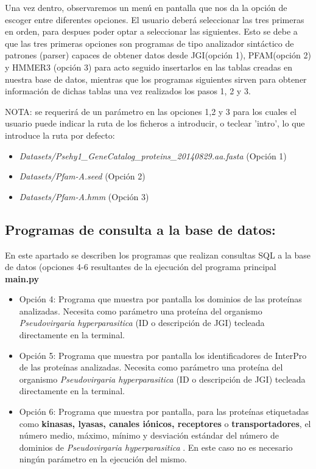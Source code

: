 \documentclass[11pt]{article} %
\begin{document}
Una vez dentro, observaremos un menú en pantalla que nos da la opción de escoger entre diferentes opciones. El usuario deberá seleccionar las tres primeras en orden, para despues poder optar a seleccionar las siguientes.
Esto se debe a que las tres primeras opciones son programas de tipo analizador sintáctico de patrones (parser) capaces de obtener datos desde JGI(opción 1), PFAM(opción 2) y HMMER3 (opción 3) para acto seguido insertarlos en las tablas creadas en nuestra base de datos, mientras que los programas siguientes sirven para obtener información de dichas tablas una vez realizados los pasos 1, 2 y 3.

NOTA: se requerirá de un parámetro en las opciones 1,2 y 3 para los cuales el usuario puede indicar la ruta de los ficheros a introducir, o teclear 'intro', lo que introduce la ruta por defecto:

\begin{itemize}

\item \emph{Datasets/Psehy1\_GeneCatalog\_proteins\_20140829.aa.fasta} (Opción 1)

\item \emph{Datasets/Pfam-A.seed} (Opción 2)

\item \emph{Datasets/Pfam-A.hmm} (Opción 3)

\end{itemize}

\subsection{Programas de consulta a la base de datos:}

En este apartado se describen los programas que realizan consultas SQL a la base de datos (opciones 4-6 resultantes de la ejecución del programa principal \textbf{main.py}

\begin{itemize}

\item Opción 4: Programa que muestra por pantalla los dominios de las proteínas analizadas. Necesita como parámetro una proteína del organismo \emph{Pseudovirgaria hyperparasitica} (ID o descripción de JGI) tecleada directamente en la terminal.

\item Opción 5: Programa que muestra por pantalla los identificadores de InterPro  de las proteínas analizadas. Necesita como parámetro una proteína del organismo \emph{Pseudovirgaria hyperparasitica} (ID o descripción de JGI) tecleada directamente en la terminal.

\item Opción 6: Programa que muestra por pantalla, para las proteínas etiquetadas como \textbf{kinasas, lyasas, canales iónicos, receptores} o \textbf{transportadores}, el número medio, máximo, mínimo y desviación estándar del número de dominios de  \emph{Pseudovirgaria hyperparasitica} . En este caso no es necesario ningún parámetro en la ejecución del mismo.

\end{itemize}
\end{document}
